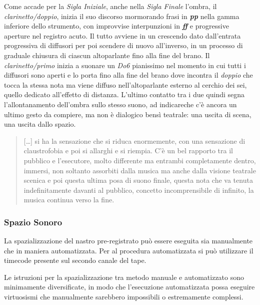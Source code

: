 Come accade per la \emph{Sigla Iniziale}, anche nella \emph{Sigla Finale} l'ombra, il \emph{clarinetto/doppio}, inizia il suo discorso mormorando frasi in \emph{\textbf{pp}} nella gamma inferiore dello strumento, con improvvise  interpunzioni in \emph{\textbf{ff}} e progressive aperture nel registro acuto. Il tutto avviene in un crescendo dato dall'entrata progressiva di diffusori per poi scendere di nuovo all'inverso, in un processo di graduale chiusura di ciascun altoparlante fino alla fine del brano. Il \emph{clarinetto/primo} inizia a suonare un \emph{Do6} pianissimo  nel momento in cui tutti i diffusori sono aperti e lo porta fino alla fine del brano dove incontra il \emph{doppio} che tocca la stessa nota ma viene diffuso nell'altoparlante esterno al cerchio dei sei, quello dedicato all'effetto di distanza. L'ultimo contatto tra i due quindi segna l'allontanamento dell'ombra sullo stesso suono, ad indicareche c'è ancora un ultimo gesto da compiere, ma non è dialogico bensì teatrale: una uscita di scena, una uscita dallo spazio.





\begin{quote}
{\small
[\ldots] si ha la sensazione che si riduca enormemente, con una sensazione di claustrofobia e poi si allarghi e si riempia. C'è un bel rapporto tra il pubblico e l'esecutore, molto differente ma entrambi completamente dentro, immersi, non soltanto assorbiti dalla musica ma anche dalla visione teatrale scenica e poi questa ultima posa di suono finale, questa nota che va tenuta indefinitamente davanti al pubblico, concetto incomprensibile di infinito, la musica continua verso la fine.
}
\end{quote}

\subsubsection*{Spazio Sonoro}

La spazializzazione del nastro pre-registrato può essere eseguita sia manualmente che in maniera automatizzata. Per al procedura automatizzata si può utilizzare il timecode presente sul secondo canale del tape.

Le istruzioni per la spazializzazione tra metodo manuale e automatizzato sono minimamente diversificate, in modo che l'esecuzione automatizzata possa eseguire virtuosismi che manualmente sarebbero impossibili o estremamente complessi.

